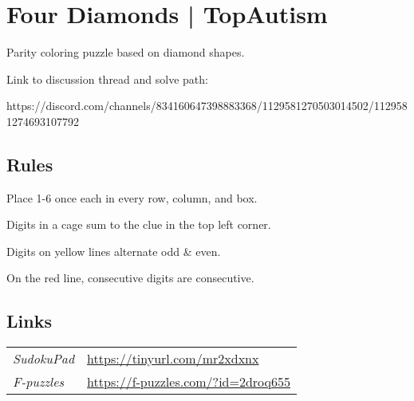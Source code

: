 \section[Four Diamonds | TopAutism {[\emph{Parity}]}]{Four Diamonds | {\normalfont TopAutism}}
\label{sec:10-four-diamonds-topautism}
Parity coloring puzzle based on diamond shapes.

Link to discussion thread and solve path:

https://discord.com/channels/834160647398883368/1129581270503014502/1129581274693107792
\subsection*{Rules}
\begin{markdown}
Place 1-6 once each in every row, column, and box.

Digits in a cage sum to the clue in the top left corner.

Digits on yellow lines alternate odd & even.

On the red line, consecutive digits are consecutive.
\end{markdown}
\subsection*{Links}
\begin{tabularx}{\textwidth}{l X}
\emph{SudokuPad} & \url{https://tinyurl.com/mr2xdxnx} \\
\emph{F-puzzles} & \url{https://f-puzzles.com/?id=2droq655} \\
\end{tabularx}
\pagebreak
